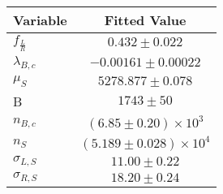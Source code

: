 \begin{tabular}[t]{lc}
\hline
Variable &Fitted Value\\
\hline\hline
$f_{\frac{L}{R}}$&$0.432\pm0.022$\\
\hline
$\lambda_{B,c}$&$-0.00161\pm0.00022$\\
\hline
$\mu_S$&$5278.877\pm0.078$\\
\hline
B&$1743\pm50$\\
\hline
$n_{B,c}$&$(6.85\pm0.20)\times 10^3$\\
\hline
$n_S$&$(5.189\pm0.028)\times 10^4$\\
\hline
$\sigma_{L, S}$&$11.00\pm0.22$\\
\hline
$\sigma_{R, S}$&$18.20\pm0.24$\\
\hline
\end{tabular}